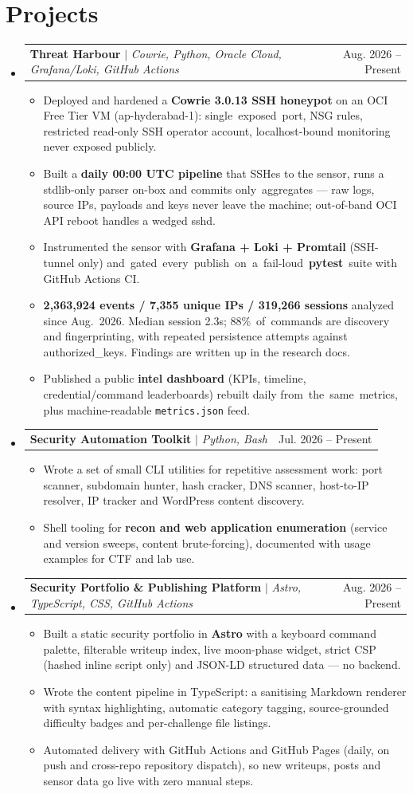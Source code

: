\documentclass[letterpaper,11pt]{article}
\makeatletter
\newcommand{\resumeItem}[1]{
  \item\small{
    {#1\vspace{-2pt}}
  }
}
\newcommand{\resumeProjectHeading}[2]{
    \item
    \begin{tabular*}{\linewidth}{l@{\extracolsep{\fill}}r}
      \small#1 & #2 \\
    \end{tabular*}\vspace{-7pt}
}
\newcommand{\resumeSubHeadingListStart}{\begin{itemize}[leftmargin=0.15in, label={}]}
\newcommand{\resumeSubHeadingListEnd}{\end{itemize}}
\newcommand{\resumeItemListStart}{\begin{itemize}}
\newcommand{\resumeItemListEnd}{\end{itemize}\vspace{-5pt}}
\makeatother
\begin{document}
\section{Projects}
    \resumeSubHeadingListStart
      \resumeProjectHeading
          {\textbf{Threat Harbour} $|$ \emph{Cowrie, Python, Oracle Cloud, Grafana/Loki, GitHub Actions}}{Aug. 2026 -- Present}
          \resumeItemListStart
            \resumeItem{Deployed and hardened a \textbf{Cowrie 3.0.13 SSH honeypot} on an OCI Free Tier VM (ap-hyderabad-1): single~exposed~port, NSG rules, restricted read-only SSH operator account, localhost-bound monitoring never exposed publicly.}
            \resumeItem{Built a \textbf{daily 00:00 UTC pipeline} that SSHes to the sensor, runs a stdlib-only parser on-box and commits \mbox{only aggregates} --- raw logs, source IPs, payloads and keys never leave the machine; out-of-band OCI API reboot handles a wedged sshd.}
            \resumeItem{Instrumented the sensor with \textbf{Grafana + Loki + Promtail} (SSH-tunnel only) \mbox{and gated every publish on a fail-loud \textbf{pytest} suite} with GitHub Actions CI.}
            \resumeItem{\textbf{2,363,924 events / 7,355 unique IPs / 319,266 sessions} analyzed since Aug.~2026. Median session 2.3s; 88\%~of~commands are discovery and fingerprinting, with repeated persistence attempts against authorized\_keys. Findings are written up in the research docs.}
            \resumeItem{Published a public \textbf{intel dashboard} (KPIs, timeline, credential/command leaderboards) rebuilt daily \mbox{from the same metrics}, plus machine-readable \texttt{metrics.json} feed.}
          \resumeItemListEnd
      \resumeProjectHeading
          {\textbf{Security Automation Toolkit} $|$ \emph{Python, Bash}}{Jul. 2026 -- Present}
          \resumeItemListStart
            \resumeItem{Wrote a set of small CLI utilities for repetitive assessment work: port scanner, subdomain hunter, hash cracker, DNS scanner, host-to-IP resolver, IP tracker and WordPress content discovery.}
            \resumeItem{Shell tooling for \textbf{recon and web application enumeration} (service and version sweeps, content brute-forcing), documented with usage examples for CTF and lab use.}
          \resumeItemListEnd
      \resumeProjectHeading
          {\textbf{Security Portfolio \& Publishing Platform} $|$ \emph{Astro, TypeScript, CSS, GitHub Actions}}{Aug. 2026 -- Present}
          \resumeItemListStart
            \resumeItem{Built a static security portfolio in \textbf{Astro} with a keyboard command palette, filterable writeup index, live moon-phase widget, strict CSP (hashed inline script only) and JSON-LD structured data --- no backend.}
            \resumeItem{Wrote the content pipeline in TypeScript: a sanitising Markdown renderer with syntax highlighting, automatic category tagging, source-grounded difficulty badges and per-challenge file listings.}
            \resumeItem{Automated delivery with GitHub Actions and GitHub Pages (daily, on push and cross-repo repository dispatch), so new writeups, posts and sensor data go live with zero manual steps.}
          \resumeItemListEnd
    \resumeSubHeadingListEnd
\end{document}
